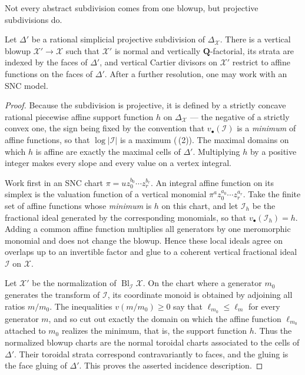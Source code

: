 Not every abstract subdivision comes from one blowup, but projective
subdivisions do.

\begin{theorem}\label{thm:skeleton-subdivision}
Let $\Delta'$ be a rational simplicial projective subdivision of
$\Delta_{\mathcal X}$. There is a vertical blowup
$\mathcal X'\to\mathcal X$ such that $\mathcal X'$ is normal and
vertically $\mathbf Q$-factorial, its strata are indexed by the faces of
$\Delta'$, and vertical Cartier divisors on $\mathcal X'$ restrict to
affine functions on the faces of $\Delta'$. After a further resolution,
one may work with an SNC model.
\end{theorem}
\begin{proof}
Because the subdivision is projective, it is defined by a strictly concave
rational piecewise affine support function $h$ on $\Delta_{\mathcal X}$ --- the
negative of a strictly convex one, the sign being fixed by the convention
that $v_\bullet(\mathcal I)$ is a \emph{minimum} of affine functions, so that
$\log|\mathcal I|$ is a maximum
(\,(2)).  The maximal domains on which $h$ is
affine are exactly the maximal cells of $\Delta'$.  Multiplying $h$ by a positive integer makes every slope and
every value on a vertex integral.

Work first in an SNC chart
$\pi=u z_0^{b_0}\cdots z_r^{b_r}$.  An integral affine function on its
simplex is the valuation function of a vertical monomial
$\pi^a z_0^{a_0}\cdots z_r^{a_r}$.  Take the finite set of affine functions
whose \emph{minimum} is $h$ on this chart, and let $\mathcal I_h$ be the
fractional ideal generated by the corresponding monomials, so that
$v_\bullet(\mathcal I_h)=h$.  Adding a common affine
function multiplies all generators by one meromorphic monomial and does not
change the blowup.  Hence these local ideals agree on overlaps up to an
invertible factor and glue to a coherent vertical fractional ideal
$\mathcal I$ on $\mathcal X$.

Let $\mathcal X'$ be the normalization of
$\operatorname{Bl}_{\mathcal I}\mathcal X$.  On the chart where a generator
$m_0$ generates the transform of $\mathcal I$, its coordinate monoid is
obtained by adjoining all ratios $m/m_0$.  The inequalities
$v(m/m_0)\ge0$ say that $\ell_{m_0}\le\ell_m$ for every generator $m$, and so
cut out exactly the domain on which the affine function $\ell_{m_0}$ attached
to $m_0$ realizes the minimum, that is, the support function $h$.  Thus the normalized
blowup charts are the normal toroidal charts associated to the cells of
$\Delta'$.  Their toroidal strata correspond contravariantly to faces, and
the gluing is the face gluing of $\Delta'$.  This proves the asserted
incidence description.


\end{proof}
